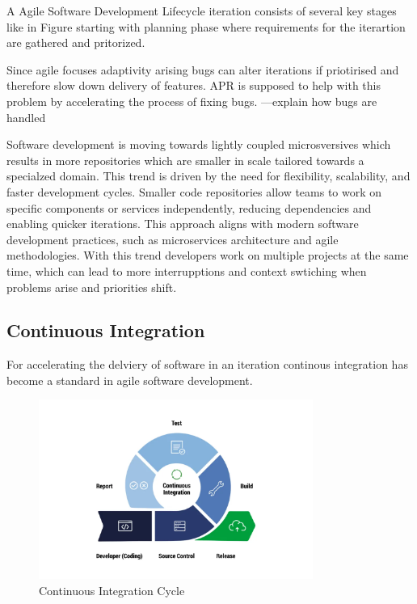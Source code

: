 A Agile Software Development Lifecycle iteration consists of several key stages like in Figure starting with planning phase where requirements for the iterartion are gathered and pritorized.

Since agile focuses adaptivity arising bugs can alter iterations if priotirised and therefore slow down delivery of features. APR is supposed to help with this problem by accelerating the process of fixing bugs.
---explain how bugs are handled

Software development is moving towards lightly coupled microsversives which results in more repositories which are smaller in scale tailored towards a specialzed domain. This trend is driven by the need for flexibility, scalability, and faster development cycles. Smaller code repositories allow teams to work on specific components or services independently, reducing dependencies and enabling quicker iterations. This approach aligns with modern software development practices, such as microservices architecture and agile methodologies.
With this trend developers work on multiple projects at the same time, which can lead to more interrupptions and context swtiching when problems arise and priorities shift.


\subsection{Continuous Integration}

For accelerating the delviery of software in an iteration continous integration has become a standard in agile software development.

\begin{figure}[htbp]
    \centering
    \includegraphics[width=0.8\textwidth]{images/ci-cycle.png}
    \caption{Continuous Integration Cycle}
    \label{fig:ci-cycle}
\end{figure}

